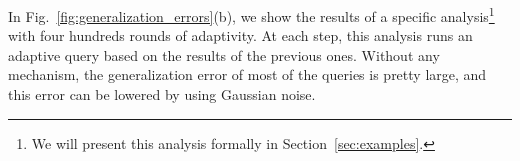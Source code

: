 In Fig.~\ref{fig:generalization_errors}(b), we show the results of a specific analysis\footnote{We will present this analysis formally in Section~\ref{sec:examples}.} with four hundreds rounds of adaptivity.
At each step, this analysis runs an adaptive query based on the results of the previous ones. Without any mechanism, the generalization error of most of the queries is pretty large, and this error can be lowered by using Gaussian noise. 
